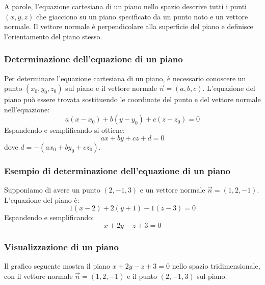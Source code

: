 \documentclass{article}
\begin{document}
A parole, l'equazione cartesiana di un piano nello spazio descrive tutti i punti
\((x, y, z)\) che giacciono su un piano specificato da un punto noto e un vettore normale.
Il vettore normale è perpendicolare alla superficie del piano e definisce l'orientamento del
piano stesso.

\subsubsection{Determinazione dell'equazione di un piano}
Per determinare l'equazione cartesiana di un piano, è necessario conoscere un punto
\((x_0, y_0, z_0)\) sul piano e il vettore normale \(\vec{n} = (a, b, c)\).
L'equazione del piano può essere trovata sostituendo le coordinate del punto e del vettore
normale nell'equazione:
\[
    a(x - x_0) + b(y - y_0) + c(z - z_0) = 0
\]
Espandendo e semplificando si ottiene:
\[
    ax + by + cz + d = 0
\]
dove \(d = -(ax_0 + by_0 + cz_0)\).

\subsubsection{Esempio di determinazione dell'equazione di un piano}
Supponiamo di avere un punto \((2, -1, 3)\) e un vettore normale \(\vec{n} = (1, 2, -1)\). L'equazione del piano è:
\[
    1(x - 2) + 2(y + 1) - 1(z - 3) = 0
\]
Espandendo e semplificando:
\[
    x + 2y - z + 3 = 0
\]

\subsubsection{Visualizzazione di un piano}
Il grafico seguente mostra il piano \(x + 2y - z + 3 = 0\) nello spazio tridimensionale, con il vettore normale \(\vec{n} = (1, 2, -1)\) e il punto \((2, -1, 3)\) sul piano.
\vspace*{0.5cm}
\begin{center}
\end{center}
\end{document}
